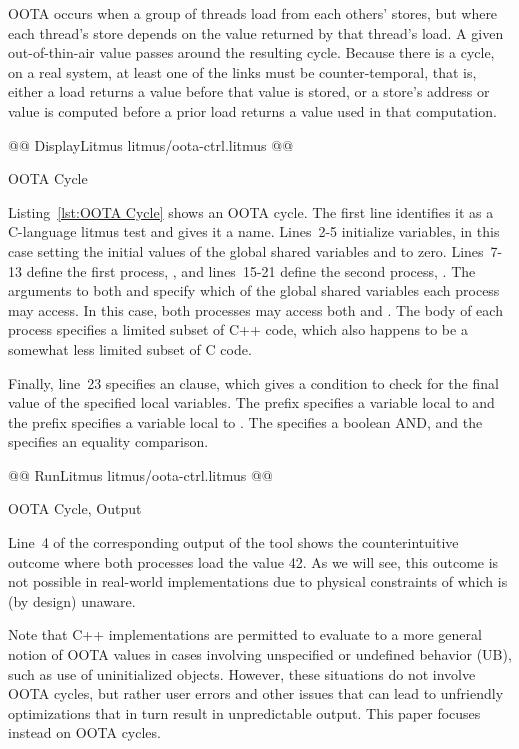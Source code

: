 \documentclass[10]{article}
\begin{document}
OOTA occurs when a group of threads load from each others' stores,
but where each thread's store depends on the value returned by that
thread's load.
A given out-of-thin-air value passes around the resulting cycle.
Because there is a cycle, on a real system, at least one of the links
must be counter-temporal, that is, either a load returns a value before
that value is stored, or a store's address or value is computed before
a prior load returns a value used in that computation.

\begin{listing}[tbp]
@@ DisplayLitmus litmus/oota-ctrl.litmus @@
\caption{OOTA Cycle}
\label{lst:OOTA Cycle}
\end{listing}

Listing~\ref{lst:OOTA Cycle}
shows an OOTA cycle.
The first line identifies it as a C-language litmus test and gives it
a name.
Lines~2-5 initialize variables, in this case setting the initial
values of the global shared variables  and  to zero.
Lines~7-13 define the first process, , and lines~15-21
define the second process, .
The arguments to both  and  specify which of
the global shared variables each process may access.
In this case, both processes may access both  and .
The body of each process specifies a limited subset of C++ code,
which also happens to be a somewhat less limited subset of C code.

Finally, line~23 specifies an  clause, which gives a
condition to check for the final value of the specified local
variables.
The  prefix specifies a variable local to  and
the  prefix specifies a variable local to .
The \co{/\\} specifies a boolean AND, and the \co{=} specifies
an equality comparison.

\begin{listing}[tbp]
@@ RunLitmus litmus/oota-ctrl.litmus @@
\caption{OOTA Cycle,  Output}
\label{lst:OOTA Cycle, herd7 Output}
\end{listing}

Line~4 of the corresponding output of the  tool shows the
counterintuitive outcome where both processes load the value 42.
As we will see, this outcome is not possible in real-world implementations
due to physical constraints of which  is (by design) unaware.

Note that C++ implementations are permitted to evaluate to a more
general notion of OOTA values in cases involving unspecified or undefined
behavior (UB), such as use of uninitialized objects.
However, these situations do not involve OOTA cycles, but rather user
errors and other issues that can lead to unfriendly optimizations that
in turn result in unpredictable output.
This paper focuses instead on OOTA cycles.
\end{document}
